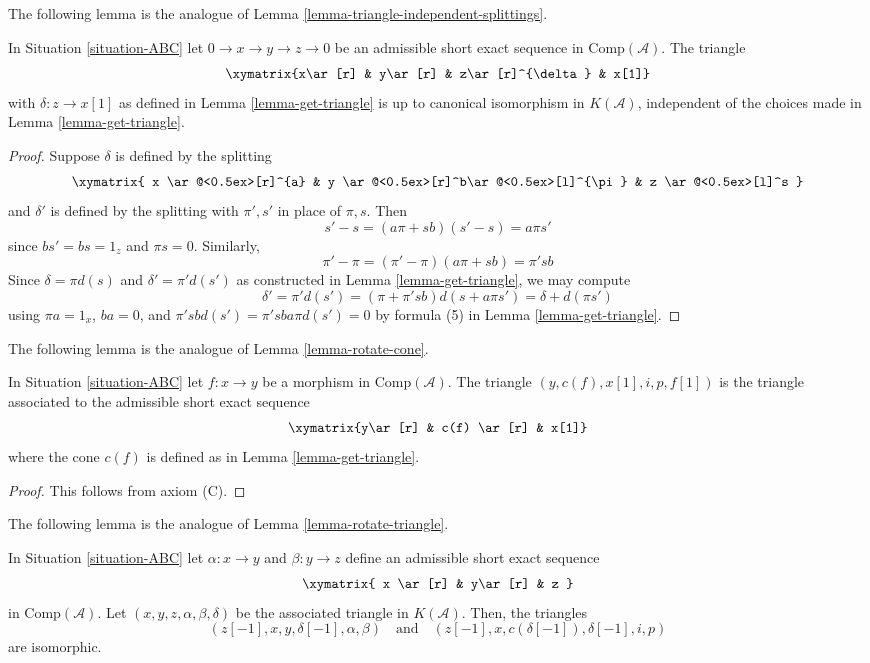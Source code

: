\noindent
The following lemma is the analogue of
Lemma \ref{lemma-triangle-independent-splittings}.

\begin{lemma}
\label{lemma-analogue-triangle-independent-splittings}
In Situation \ref{situation-ABC}
let $0 \to x \to y \to z \to 0$ be an admissible short
exact sequence in $\text{Comp}(\mathcal{A})$. The triangle
$$
\xymatrix{x\ar[r] & y\ar[r] & z\ar[r]^{\delta} & x[1]}
$$
with $\delta: z \to x[1]$ as defined in Lemma \ref{lemma-get-triangle}
is up to canonical isomorphism in $K(\mathcal{A})$, independent of the
choices made in Lemma \ref{lemma-get-triangle}.
\end{lemma}

\begin{proof}
Suppose $\delta$ is defined by the splitting
$$
\xymatrix{
x \ar@<0.5ex>[r]^{a} &
y \ar@<0.5ex>[r]^b\ar@<0.5ex>[l]^{\pi} &
z \ar@<0.5ex>[l]^s
}
$$
and $\delta'$ is defined by the splitting with $\pi',s'$
in place of $\pi,s$. Then
$$
s'-s = (a\pi+sb)(s'-s) = a\pi s'
$$
since $bs' = bs = 1_z$ and $\pi s = 0$. Similarly,
$$
\pi'-\pi = (\pi'-\pi)(a\pi+sb) = \pi'sb
$$
Since $\delta=\pi d(s)$ and $\delta'=\pi'd(s')$
as constructed in Lemma \ref{lemma-get-triangle}, we may compute
$$
\delta' = \pi'd(s') = (\pi+\pi'sb)d(s+a\pi s') = \delta+d(\pi s')
$$
using $\pi a=1_x$, $ba=0$, and $\pi'sbd(s')=\pi'sba\pi d(s')=0$
by formula (5) in Lemma \ref{lemma-get-triangle}.
\end{proof}

\noindent
The following lemma is the analogue of Lemma \ref{lemma-rotate-cone}.

\begin{lemma}
\label{lemma-restate-axiom-c}
In Situation \ref{situation-ABC}
let $f: x \to y$ be a morphism in $\text{Comp}(\mathcal{A})$.
The triangle $(y, c(f), x[1], i, p, f[1])$ is the triangle associated
to the admissible short exact sequence 
$$
\xymatrix{y\ar[r] & c(f) \ar[r] & x[1]}
$$
where the cone $c(f)$ is defined as in Lemma \ref{lemma-get-triangle}.
\end{lemma}

\begin{proof}
This follows from axiom (C).
\end{proof}

\noindent
The following lemma is the analogue of Lemma \ref{lemma-rotate-triangle}.

\begin{lemma}
\label{lemma-cone-rotate-isom}
In Situation \ref{situation-ABC} let $\alpha : x \to y$ and $\beta : y \to z$
define an admissible short exact sequence
$$
\xymatrix{
x \ar[r] &
y\ar[r] &
z
}
$$
in $\text{Comp}(\mathcal{A})$. Let $(x, y, z, \alpha, \beta, \delta)$
be the associated triangle in $K(\mathcal{A})$. Then, the triangles
$$
(z[-1], x, y, \delta[-1], \alpha, \beta)
\quad\text{and}\quad
(z[-1], x, c(\delta[-1]), \delta[-1], i, p)
$$
are isomorphic. 
\end{lemma}

